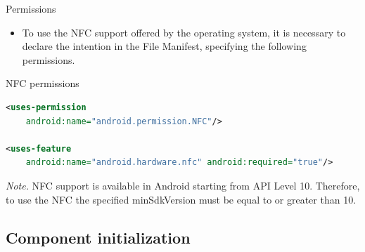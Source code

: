 \documentclass{beamer}
\begin{document}
  \begin{frame}[fragile]{Permissions}
    \begin{itemize}
      \item To use the NFC support offered by the operating system, it is
      necessary to declare the intention in the File Manifest, specifying the
      following permissions.
    \end{itemize}

    \begin{exampleblock}{NFC permissions}
      \begin{lstlisting}[language=XML]
<uses-permission
    android:name="android.permission.NFC"/>
    
<uses-feature
    android:name="android.hardware.nfc" android:required="true"/>
      \end{lstlisting}
    \end{exampleblock}
    \vspace{10pt}
    {\small \textit{Note.} NFC support is available in Android starting from API
   Level 10. Therefore, to use the NFC the specified minSdkVersion must be equal
   to or greater than 10.}
  \end{frame}

\subsection{Component initialization}
\end{document}
